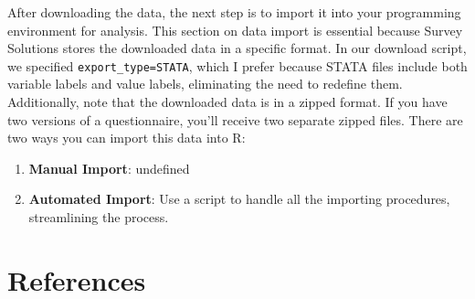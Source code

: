 \documentclass[
  letterpaper,
  DIV=11,
  numbers=noendperiod]{scrreprt}
\newlength{\cslhangindent}
\newenvironment{CSLReferences}[2] %
 {\begin{list}{}{%
  \setlength{\itemindent}{0pt}
  \setlength{\leftmargin}{0pt}
  \setlength{\parsep}{0pt}
  \ifodd #1
   \setlength{\leftmargin}{\cslhangindent}
   \setlength{\itemindent}{-1\cslhangindent}
  \fi
  \setlength{\itemsep}{#2\baselineskip}}}
 {\end{list}}
\begin{document}
After downloading the data, the next step is to import it into your
programming environment for analysis. This section on data import is
essential because Survey Solutions stores the downloaded data in a
specific format. In our download script, we specified
\texttt{export\_type=\textquotesingle{}STATA\textquotesingle{}}, which I
prefer because STATA files include both variable labels and value
labels, eliminating the need to redefine them. Additionally, note that
the downloaded data is in a zipped format. If you have two versions of a
questionnaire, you'll receive two separate zipped files. There are two
ways you can import this data into R:

\begin{enumerate}
\def\labelenumi{\arabic{enumi}.}
\item
  \textbf{Manual Import}: undefined
\item
  \textbf{Automated Import}: Use a script to handle all the importing
  procedures, streamlining the process.
\end{enumerate}


\chapter*{References}\label{references}


\label{refs}
\begin{CSLReferences}{0}{1}
\end{CSLReferences}
\end{document}
